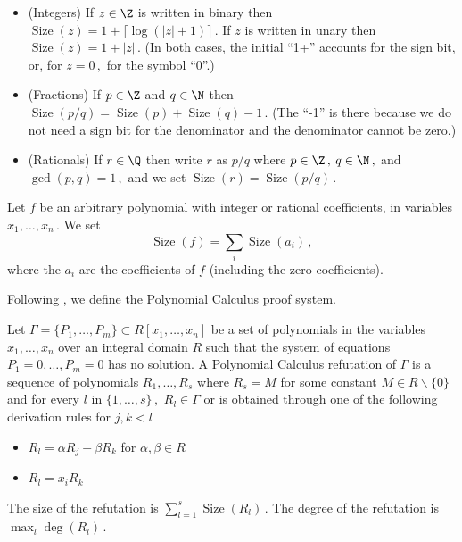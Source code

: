 \documentclass{toc}
\DeclareMathOperator{\Size}{\mathrm{Size}}   %
\begin{document}
\begin{definition}
  \label{def:IntegerSize}
\leavevmode   
\begin{itemize} 
\item (Integers) If $z \in \Z$ is written in binary then 
$\Size(z) = 1+ \lceil \log(|z|+1)\rceil\,.$ %
If $z$ is written in unary then %
$\Size(z)=1+|z|\,.$ %
(In both cases, the initial ``1+'' accounts for the sign bit, or, for %
$z=0\,,$ %
for the symbol ``0''.)
\item (Fractions) If $p\in\Z$ and $q\in \N$ then %
$\Size(p/q)=\Size(p)+\Size(q)-1\,.$ %
(The ``-1'' is there because we do not need a sign bit for the denominator
and the denominator cannot be zero.)  
\item (Rationals) If $r\in\Q$ then write $r$ as $p/q$ where %
$p\in\Z\,,$ %
$q\in\N\,,$ %
  and %
$\gcd(p,q)=1\,,$ %
 and we set %
$\Size(r)=\Size(p/q)\,.$ %
\end{itemize}
\end{definition}  %

\begin{definition} \label{def:PolynomialSize}
Let $f$ be an arbitrary %
polynomial with integer or rational coefficients, in variables 
%
%
%
$x_1, \ldots, x_n\,.$ %
%
%
%
%
%
%
%
%
%
%
We set
%
$$ \Size(f) = \sum_i \Size(a_i)\,,$$ %
where the $a_i$ are the coefficients of $f$ (including the zero coefficients).  %
\end{definition}

Following  \cite{CEI96}, we define the Polynomial Calculus proof system.

\begin{definition}\label{def:PC}
Let $\Gamma = \{P_1, \ldots, P_m\} \subset R[x_1, \ldots, x_n]$ be a set of polynomials in
the variables %
%
$x_1, \ldots, x_n$  %
%
over an integral domain $R$  such that the system of equations $P_1 = 0, \ldots, P_m = 0$ has no solution. A Polynomial Calculus refutation of $\Gamma$ is a sequence of polynomials $R_1, \ldots, R_s$ where $R_s = M$ for some constant $M \in R \backslash \{0\}$  and for every $l$ in %
$\{1, \ldots, s\}\,,$ %
 $R_l \in \Gamma$ or is obtained through one of the following derivation rules for $j, k < l$
\begin{itemize}
    \item $R_l = \alpha R_j + \beta R_k$ for $\alpha, \beta \in R$
    \item $R_l = x_i R_k$
\end{itemize}
The size of the refutation is %
$\sum_{l = 1}^s \Size(R_l)\,.$ %
 The degree of the refutation is
%
%
$\max_l \deg(R_l)\,.$ %
%
\end{definition}
\end{document}
